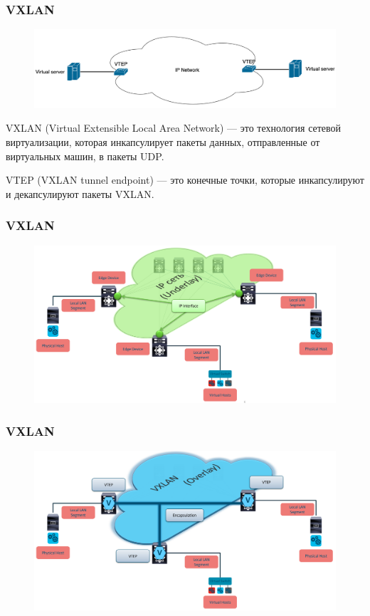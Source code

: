 \documentclass[aspectratio=169]{beamer}
\begin{document}
\begin{frame}
  \frametitle{VXLAN}

  \begin{figure}[H]
    \centering
    \includegraphics[width=\textwidth]{images/vtep.png}
  \end{figure}

  VXLAN (Virtual Extensible Local Area Network) --- это технология сетевой
  виртуализации, которая инкапсулирует пакеты данных, отправленные от
  виртуальных машин, в пакеты UDP.

  \vspace*{1em}

  VTEP (VXLAN tunnel endpoint) --- это конечные точки, которые инкапсулируют и
  декапсулируют пакеты VXLAN.
\end{frame}

\begin{frame}
  \frametitle{VXLAN}

  \begin{figure}[H]
    \centering
    \includegraphics[width=\textwidth]{images/underlay.png}
  \end{figure}
\end{frame}

\begin{frame}
  \frametitle{VXLAN}

  \begin{figure}[H]
    \centering
    \includegraphics[width=\textwidth]{images/overlay.png}
  \end{figure}
\end{frame}
\end{document}
